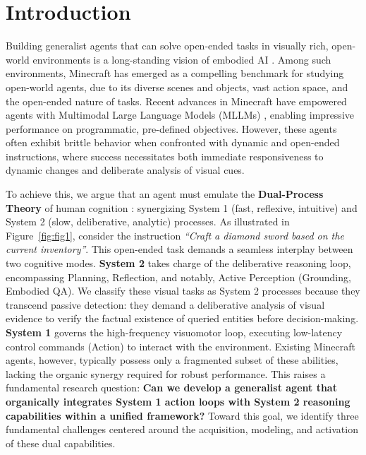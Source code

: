 
\section{Introduction}
Building generalist agents that can solve open-ended tasks in visually rich, open-world environments is a long-standing vision of embodied AI \cite{hafner2023mastering,tan2024towards,raad2024scaling,yang2024video}. Among such environments, Minecraft \cite{guss2019minerl,fan2022minedojo} has emerged as a compelling benchmark for studying open-world agents, due to its diverse scenes and objects, vast action space, and the open-ended nature of tasks. Recent advances in Minecraft \cite{wang2023voyager,qin2023mp5,wang2023jarvis,wang2023describe,li2024optimus,li2025optimus} have empowered agents with Multimodal Large Language Models (MLLMs) \cite{bai2025qwen2,chen2024lion,liu2024visual}, enabling impressive performance on programmatic, pre-defined objectives. However, these agents often exhibit brittle behavior when confronted with dynamic and open-ended instructions, where success necessitates both immediate responsiveness to dynamic changes and deliberate analysis of visual cues.

To achieve this, we argue that an agent must emulate the \textbf{Dual-Process Theory} of human cognition \cite{kahneman2011thinking}: synergizing System 1 (fast, reflexive, intuitive) and System 2 (slow, deliberative, analytic) processes. As illustrated in Figure~\ref{fig:fig1}, consider the instruction \emph{``Craft a diamond sword based on the current inventory''}. This open-ended task demands a seamless interplay between two cognitive modes. \textbf{System 2} takes charge of the deliberative reasoning loop, encompassing Planning, Reflection, and notably, Active Perception (Grounding, Embodied QA). We classify these visual tasks as System 2 processes because they transcend passive detection: they demand a deliberative analysis of visual evidence to verify the factual existence of queried entities before decision-making. \textbf{System 1} governs the high-frequency visuomotor loop, executing low-latency control commands (Action) to interact with the environment. Existing Minecraft agents, however, typically possess only a fragmented subset of these abilities, lacking the organic synergy required for robust performance. This raises a fundamental research question: \textbf{Can we develop a generalist agent that organically integrates System 1 action loops with System 2 reasoning capabilities within a unified framework?} Toward this goal, we identify three fundamental challenges centered around the acquisition, modeling, and activation of these dual capabilities.

